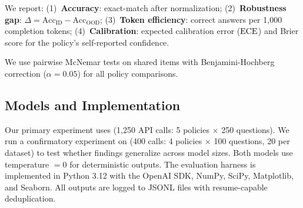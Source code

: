  We report: (1)~\textbf{Accuracy}: exact-match after normalization; (2)~\textbf{Robustness gap}: $\Delta = \text{Acc}_{\text{ID}} - \text{Acc}_{\text{OOD}}$; (3)~\textbf{Token efficiency}: correct answers per 1,000 completion tokens; (4)~\textbf{Calibration}: expected calibration error ($\text{ECE}$) and Brier score for the \padaptive policy's self-reported confidence.

 We use pairwise McNemar tests on shared items with Benjamini-Hochberg correction ($\alpha = 0.05$) for all policy comparisons.

\subsection{Models and Implementation}
\label{sec:models}

Our primary experiment uses \nano (1,250 API calls: 5 policies $\times$ 250 questions). We run a confirmatory experiment on \mini (400 calls: 4 policies $\times$ 100 questions, 20 per dataset) to test whether findings generalize across model sizes. Both models use temperature $= 0$ for deterministic outputs. The evaluation harness is implemented in Python 3.12 with the OpenAI SDK, NumPy, SciPy, Matplotlib, and Seaborn. All outputs are logged to JSONL files with resume-capable deduplication.
